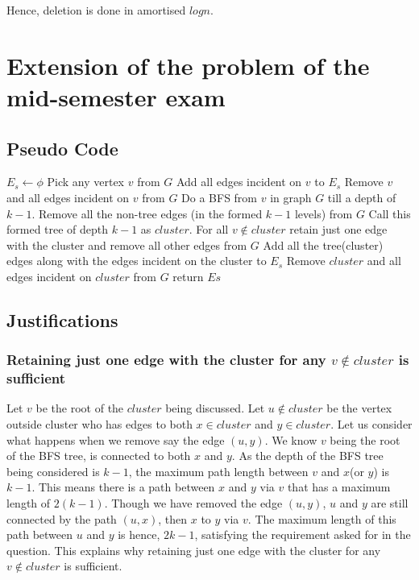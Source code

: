 \documentclass{article}
\begin{document}
Hence, deletion is done in amortised $logn$.
\newpage    
\section{Extension of the problem of the mid-semester exam}
\subsection{Pseudo Code}
\begin{algorithmic}[1]
  \State $E_s \gets \phi$
  \State Pick any vertex $v$ from $G$ 
  \State Add all edges incident on $v$ to $E_s$
  \State Remove $v$ and all edges incident on $v$ from $G$
  \Else
  \State Do a BFS from $v$ in graph $G$ till a depth of $k-1$.  
  \State Remove all the non-tree edges (in the formed $k-1$ levels) from $G$
  \State Call this formed tree of depth $k-1$ as $cluster$. 
  \State For all $v \not\in cluster$ retain just one edge with the cluster and remove all other edges from $G$
  \State Add all the tree(cluster) edges along with the edges incident on the cluster to $E_s$
  \State Remove $cluster$ and all edges incident on $cluster$ from $G$
  \EndIf
  \EndWhile
  \State return $Es$
  \EndProcedure
\end{algorithmic} 
\subsection{Justifications}
\subsubsection{Retaining just one edge with the cluster for any $v \not\in cluster$ is sufficient}
Let $v$ be the root of the $cluster$ being discussed. Let $u \not \in cluster$ be the vertex outside cluster who has edges to both $x \in cluster $ and $y \in cluster$. Let us consider what happens when we remove say the edge $(u,y)$. We know $v$ being the root of the BFS tree, is connected to both $x$ and $y$. As the depth of the BFS tree being considered is $k-1$, the maximum path length between $v$ and $x$(or $y$) is $k-1$. This means there is a path between $x$ and $y$ via $v$ that has a maximum length of $2(k-1)$. Though we have removed the edge $(u,y)$, $u$ and $y$ are still connected by the path $(u,x)$, then $x$ to $y$ via $v$. The maximum length of this path between $u$ and $y$ is hence, $2k-1$, satisfying the requirement asked for in the question. This explains why retaining just one edge with the cluster for any $v \not\in cluster$ is sufficient.
\end{document}
